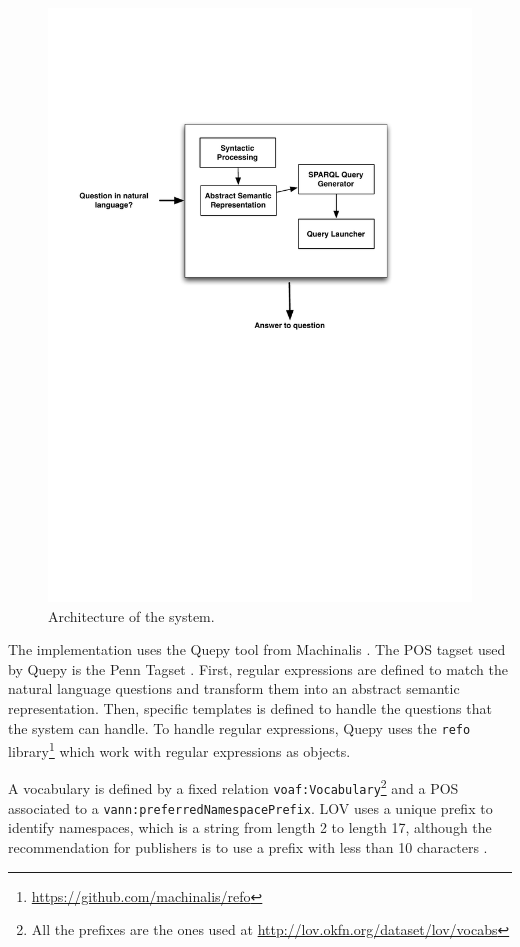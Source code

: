 \documentclass{acm}
\begin{document}
\begin{figure}[ht!b]
\centering
\caption{Architecture of the system.}
\includegraphics[scale=.6]{qa4lov-archi.pdf}

\label{fig:q4lovarchi}
\end{figure}

The implementation uses the Quepy tool from Machinalis \cite{quepy2012}. The POS tagset used by Quepy is the Penn Tagset \cite{marcus1993building}. First, regular expressions are defined to match the natural language questions and transform them into an abstract semantic representation. Then, specific templates is defined to handle the questions that the system can handle. To handle regular expressions, Quepy uses the \texttt{refo} library\footnote{\url{https://github.com/machinalis/refo}} which work with regular expressions as objects. 

A vocabulary is defined by a fixed relation \texttt{voaf:Vocabulary}\footnote{All the prefixes are the ones used at \url{http://lov.okfn.org/dataset/lov/vocabs}} and a POS associated to a \texttt{vann:preferredNamespacePrefix}. LOV uses a unique prefix to identify namespaces, which is a string from length 2 to length 17, although the recommendation for publishers is to use a prefix with less than 10 characters \cite{pybernard12}.  
\end{document}
